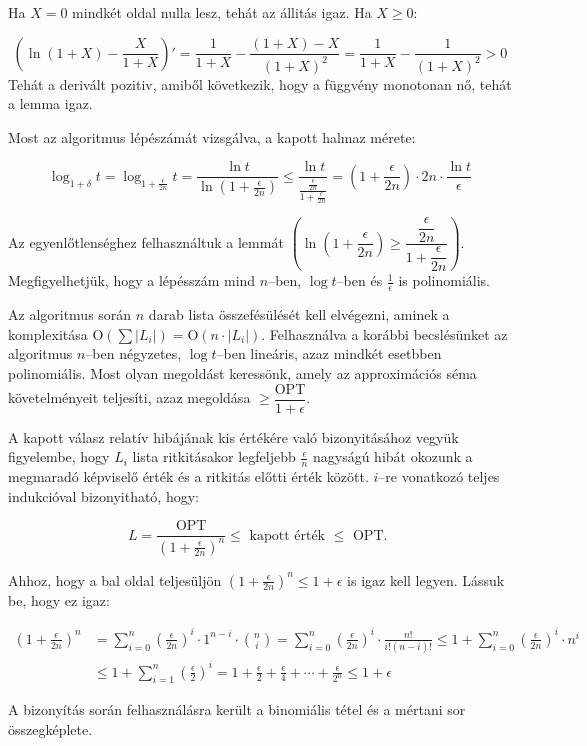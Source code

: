 Ha $X=0$ mindkét oldal nulla lesz, tehát az állitás igaz. Ha $X \geq 0$:

\[ \left( \ln{(1+X)} - \frac{X}{1+X}\right)' = \frac{1}{1+X} - \frac{(1+X)-X}{(1+X)^2} =
\frac{1}{1+X} - \frac{1}{(1+X)^2} > 0 
\]
Tehát a derivált pozitiv, amiből következik, hogy a függvény monotonan nő, tehát
a lemma igaz.

Most az algoritmus lépészámát vizsgálva, a kapott halmaz mérete:

\[ \log_{1+\delta}{t}=\log_{1+\frac{\epsilon}{2n} }{t} = \frac{\ln{t}}{\ln(1+\frac{\epsilon}{2n})}
\leq \frac{\ln{t}}{\frac{\frac{\epsilon}{2n}}{1+\frac{\epsilon}{2n}}} 
= \left(1 + \frac{\epsilon}{2n} \right) \cdot 2n \cdot \frac{\ln{t}}{\epsilon} \]

Az egyenlőtlenséghez felhasználtuk a lemmát $\left(\ln(1+\dfrac{\epsilon}{2n})
\geq \dfrac{\dfrac{\epsilon}{2n}}{1+\dfrac{\epsilon}{2n}}\right)$.
Megfigyelhetjük, hogy a lépésszám mind $n$--ben, $\log t$--ben és
$\frac{1}{\epsilon}$ is polinomiális.

Az algoritmus során $n$ darab lista összefésülését kell elvégezni, aminek a
komplexitása O$(\sum |L_i|)=$O$(n \cdot |L_i|)$. Felhasználva a korábbi
becslésünket az algoritmus $n$--ben négyzetes, $\log{t}$--ben lineáris, azaz
mindkét esetbben polinomiális. Most olyan megoldást keressönk, amely az
approximációs séma követelményeit teljesíti, azaz megoldása $\geq
\dfrac{\mbox{OPT}}{1+\epsilon}$.

A kapott válasz relatív hibájának kis értékére való bizonyitásához vegyük
figyelembe, hogy $L_i$ lista ritkitásakor legfeljebb $\frac{\epsilon}{n}$
nagyságú hibát okozunk a megmaradó képviselő érték és a ritkitás előtti érték
között. $i$--re vonatkozó teljes indukcióval bizonyitható, hogy:

\[ L = \frac{\mbox{OPT}}{(1+ \frac{\epsilon}{2n})^n} \leq \mbox{ kapott érték }
\leq \mbox{ OPT. }\]

Ahhoz, hogy a bal oldal teljesüljön $(1+\frac{\epsilon}{2n})^n \leq 1 + \epsilon$ 
is igaz kell legyen. Lássuk be, hogy ez igaz:

\begin{align*}
\left(1+\frac{\epsilon}{2n}\right)^n &= 
\sum_{i=0}^{n}\left(\frac{\epsilon}{2n}\right)^i \cdot 1^{n-i} \cdot \binom{n}{i} = 
 \sum_{i=0}^{n}\left(\frac{\epsilon}{2n}\right)^i \cdot \frac{n!}{i!(n-i)!}
 \leq 1 + \sum_{i=0}^{n}\left(\frac{\epsilon}{2n}\right)^i \cdot n^i \\
 &\leq 1 + \sum_{i=1}^{n}\left(\frac{\epsilon}{2}\right)^i = 1 + \frac{\epsilon}{2}
 + \frac{\epsilon}{4} + \cdots + \frac{\epsilon}{2^n} \leq 1 + \epsilon
\end{align*}

A bizonyítás során felhasználásra került a binomiális tétel és a mértani sor
összegképlete.